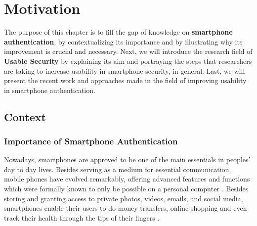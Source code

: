 
\chapter{Motivation}\label{ch:second}

The purpose of this chapter is to fill the gap of knowledge on \textbf{smartphone authentication}, by contextualizing its importance and by illustrating why its improvement is crucial and necessary. Next, we will introduce the research field of \textbf{Usable Security} by explaining its aim and portraying the steps that researchers are taking to increase usability in smartphone security, in general. Last, we will present the recent work and approaches made in the field of improving usability in smartphone authentication.   

\section{Context}

\subsection{Importance of Smartphone Authentication} \label{2.1.1}

Nowadays, smartphones are approved to be one of the main essentials in peoples' day to day lives. Besides serving as a medium for essential communication, mobile phones have evolved remarkably, offering advanced features and functions which were formally known to only be possible on a personal computer \cite{Alsaleh}. Besides storing and granting access to private photos, videos, emails, and social media, smartphones enable their users to do money transfers, online shopping and even track their health through the tips of their fingers \cite{Egelman:2014:YRL:2660267.2660273,Albayram:2017:BUL:3235924.3235929,Schloeglhofer}. \\

